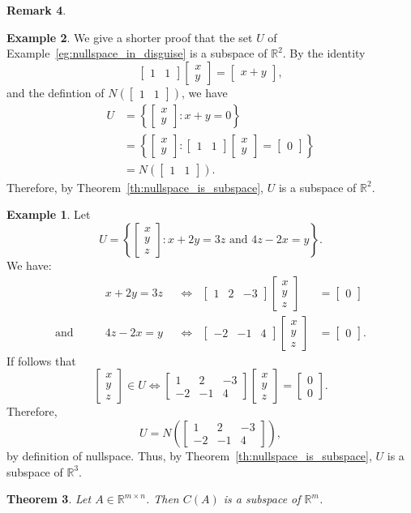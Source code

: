 \documentclass[12pt]{amsart}
\newcommand{\RR}{\mathbb{R}}
\newtheorem{theorem}{Theorem}[section]
\theoremstyle{definition} \newtheorem{definition}[theorem]{Definition}
\newtheorem{remark}[theorem]{Remark} \newtheorem{remarks}[theorem]{Remarks}
\newtheorem{example}[theorem]{Example}
\newcommand{\mat}[1]{\begin{bmatrix}#1\end{bmatrix}}
\begin{document}
\begin{remark}
\begin{example}
  We give a shorter proof that the set $U$ of Example~\ref{eg:nullspace_in_disguise} is a subspace of $\RR^2$.
  By the identity
  \[
    \mat{1&1}\mat{x\\y} = \mat{x+y},
  \]
  and the defintion of $N\left(\mat{1&1}\right)$, we have
  \begin{align*}
    U &= \left\{\mat{x\\y} : x + y = 0\right\}\\
      &= \left\{\mat{x\\y} : \mat{1& 1}\mat{x\\y} =
        \mat{0}\right\}\\
      &= N\left(\mat{1&1}\right).
  \end{align*}
  Therefore, by Theorem~\ref{th:nullspace_is_subspace}, $U$ is a subspace of $\RR^2$.

\begin{example}
  Let
  \[
    U = \left\{\mat{x\\y\\z} : \text{$x + 2y = 3z$ and
    $4z - 2x = y$}\right\}.
  \]
  We have:
  \begin{align*}
    &x+2y=3z& &\Longleftrightarrow& \mat{1&2&-3}\mat{x\\y\\z}&=\mat{0}\\
    \text{and}\qquad& 4z-2x=y& &\Longleftrightarrow& 
    \mat{-2&-1&4}\mat{x\\y\\z}&=\mat{0}.
  \end{align*}
  If follows that
  \[
    \mat{x\\y\\z}\in U\Longleftrightarrow
    \mat{1&2&-3\\-2&-1&4}\mat{x\\y\\z}=\mat{0\\0}.
  \]
  Therefore,
  \[
    U = N\left(\mat{1&2&-3\\-2&-1&4}\right),
  \]
  by definition of nullspace.
  Thus, by Theorem~\ref{th:nullspace_is_subspace}, $U$ is a subspace of $\RR^3$.

\end{example}

\end{example}

\begin{theorem}\label{th:col_space_is_subspace}
  Let $A\in\RR^{m\times n}$. Then $C(A)$ is a subspace of $\RR^m$.
\end{theorem}


\end{remark}
\end{document}
